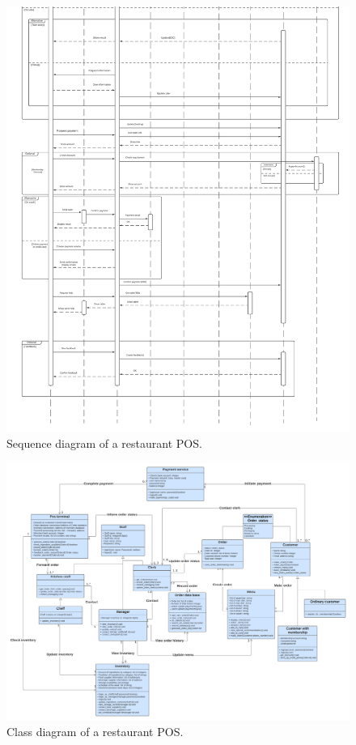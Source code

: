 \documentclass[12pt, a4paper]{article}
\theoremstyle{styleth}
\theoremstyle{styledef}
\begin{document}
\begin{figure}
	\centering
	\includegraphics[width=16.5cm]{image.png}
	\caption{Sequence diagram of a restaurant POS.}
	\label{fig:seqdiag2}
\end{figure}

\begin{figure}
	\centering
	\includegraphics[width=23cm]{image (2).png}
	\caption{Class diagram of a restaurant POS.}
	\label{fig:classdiag}
\end{figure}
\end{document}
